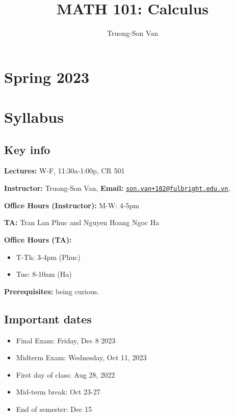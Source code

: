 \documentclass[
]{article}
\title{MATH 101: Calculus}
\author{Truong-Son Van}
\date{}
\providecommand{\tightlist}{%
  \setlength{\itemsep}{0pt}\setlength{\parskip}{0pt}}
\begin{document}
\maketitle

{
\setcounter{tocdepth}{2}
\tableofcontents
}
\section*{Spring 2023}\label{spring-2023}

\section*{Syllabus}\label{syllabus}

\subsection*{Key info}\label{key-info}

\textbf{Lectures:} W-F, 11:30a-1:00p, CR 501

\textbf{Instructor:} Truong-Son Van, \textbf{Email:} \href{mailto:son.van+102@fulbright.edu.vn}{\nolinkurl{son.van+102@fulbright.edu.vn}},

\textbf{Office Hours (Instructor):} M-W: 4-5pm

\textbf{TA:} Tran Lan Phuc and Nguyen Hoang Ngoc Ha

\textbf{Office Hours (TA):}

\begin{itemize}
\item
  T-Th: 3-4pm (Phuc)
\item
  Tue: 8-10am (Ha)
\end{itemize}

\textbf{Prerequisites:} being curious.

\subsection*{Important dates}\label{important-dates}

\begin{itemize}
\tightlist
\item
  Final Exam: Friday, Dec 8 2023
\item
  Midterm Exam: Wednesday, Oct 11, 2023
\item
  First day of class: Aug 28, 2022
\item
  Mid-term break: Oct 23-27
\item
  End of semester: Dec 15
\end{itemize}
\end{document}
